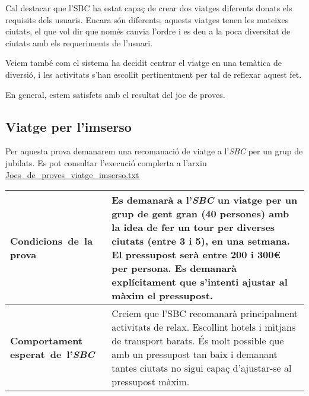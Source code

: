 \documentclass[11pt,a4paper]{article}
\begin{document}
\medskip

Cal destacar que l'SBC ha estat capaç de crear dos viatges diferents donats els requisits dels usuaris. Encara són diferents, aquests viatges tenen les mateixes ciutats, el que vol dir que només canvia l'ordre i es deu a la poca diversitat de ciutats amb els requeriments de l'usuari.

Veiem també com el sistema ha decidit centrar el viatge en una temàtica de diversió, i les activitats s'han escollit pertinentment per tal de reflexar aquest fet.

En general, estem satisfets amb el resultat del joc de proves.

\subsection{Viatge per l'imserso}
Per aquesta prova demanarem una recomanació de viatge a l'\emph{SBC} per un grup de jubilats. Es pot consultar l'execució complerta a l'arxiu \url{Jocs_de_proves_viatge_imserso.txt} \\

\noindent
\begin{tabular}{|p{}|p{}|}
\hline
\textbf{\mbox{Condicions de la} \mbox{prova}} & Es demanarà a l'\emph{SBC} un viatge per un grup de gent gran (40 persones) amb la idea de fer un tour per diverses ciutats (entre 3 i 5), en una setmana. El pressupost serà entre 200 i 300\euro{} per persona. Es demanarà explícitament que s'intenti ajustar al màxim el pressupost.\\
\hline
\textbf{Comportament \mbox{esperat de l'\emph{SBC}}} & Creiem que l'SBC recomanarà principalment activitats de relax. Escollint hotels i mitjans de transport barats. És molt possible que amb un pressupost tan baix i demanant tantes ciutats no sigui capaç d'ajustar-se al pressupost màxim.\\
\hline
\end{tabular}
\bigskip
\end{document}
